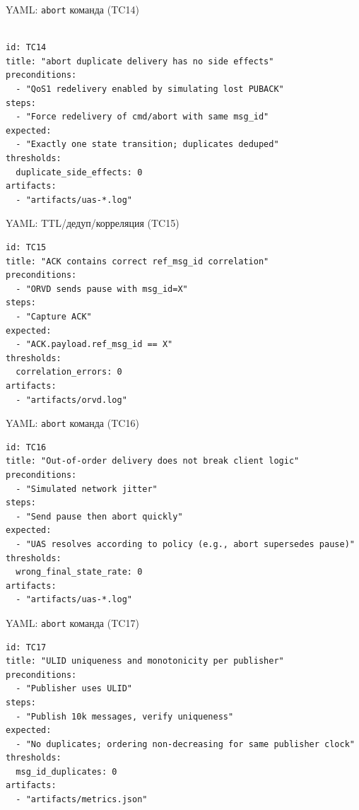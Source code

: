 \documentclass[aspectratio=169]{beamer}
\begin{document}
\begin{frame}[fragile]{YAML: \texttt{abort} команда (TC14)}
\begin{Verbatim}[fontsize=\scriptsize, baselinestretch=0.85]

id: TC14
title: "abort duplicate delivery has no side effects"
preconditions:
  - "QoS1 redelivery enabled by simulating lost PUBACK"
steps:
  - "Force redelivery of cmd/abort with same msg_id"
expected:
  - "Exactly one state transition; duplicates deduped"
thresholds:
  duplicate_side_effects: 0
artifacts:
  - "artifacts/uas-*.log"
\end{Verbatim}
\end{frame}

\begin{frame}[fragile]{YAML: TTL/дедуп/корреляция (TC15)}
\begin{Verbatim}[fontsize=\scriptsize, baselinestretch=0.85]
id: TC15
title: "ACK contains correct ref_msg_id correlation"
preconditions:
  - "ORVD sends pause with msg_id=X"
steps:
  - "Capture ACK"
expected:
  - "ACK.payload.ref_msg_id == X"
thresholds:
  correlation_errors: 0
artifacts:
  - "artifacts/orvd.log"

\end{Verbatim}
\end{frame}

\begin{frame}[fragile]{YAML: \texttt{abort} команда (TC16)}
\begin{Verbatim}[fontsize=\scriptsize, baselinestretch=0.85]
id: TC16
title: "Out-of-order delivery does not break client logic"
preconditions:
  - "Simulated network jitter"
steps:
  - "Send pause then abort quickly"
expected:
  - "UAS resolves according to policy (e.g., abort supersedes pause)"
thresholds:
  wrong_final_state_rate: 0
artifacts:
  - "artifacts/uas-*.log"

\end{Verbatim}
\end{frame}

\begin{frame}[fragile]{YAML: \texttt{abort} команда (TC17)}
\begin{Verbatim}[fontsize=\scriptsize, baselinestretch=0.85]
id: TC17
title: "ULID uniqueness and monotonicity per publisher"
preconditions:
  - "Publisher uses ULID"
steps:
  - "Publish 10k messages, verify uniqueness"
expected:
  - "No duplicates; ordering non-decreasing for same publisher clock"
thresholds:
  msg_id_duplicates: 0
artifacts:
  - "artifacts/metrics.json"

\end{Verbatim}
\end{frame}
\end{document}
